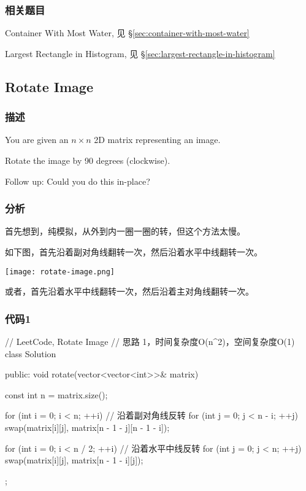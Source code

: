\subsubsection{相关题目}
\begindot
\item Container With Most Water, 见 \S \ref{sec:container-with-most-water}
\item Largest Rectangle in Histogram, 见 \S \ref{sec:largest-rectangle-in-histogram}
\myenddot


\subsection{Rotate Image} %
\label{sec:rotate-image}


\subsubsection{描述}
You are given an $n \times n$ 2D matrix representing an image.

Rotate the image by 90 degrees (clockwise).

Follow up:
Could you do this in-place?


\subsubsection{分析}
首先想到，纯模拟，从外到内一圈一圈的转，但这个方法太慢。

如下图，首先沿着副对角线翻转一次，然后沿着水平中线翻转一次。

\begin{center}
\texttt{[image: rotate-image.png]}\\
\label{fig:rotate-image}
\end{center}

或者，首先沿着水平中线翻转一次，然后沿着主对角线翻转一次。


\subsubsection{代码1}
\begin{Code}
// LeetCode, Rotate Image
// 思路 1，时间复杂度O(n^2)，空间复杂度O(1)
class Solution {
public:
    void rotate(vector<vector<int>>& matrix) {
        const int n = matrix.size();

        for (int i = 0; i < n; ++i)  // 沿着副对角线反转
            for (int j = 0; j < n - i; ++j)
                swap(matrix[i][j], matrix[n - 1 - j][n - 1 - i]);

        for (int i = 0; i < n / 2; ++i) // 沿着水平中线反转
            for (int j = 0; j < n; ++j)
                swap(matrix[i][j], matrix[n - 1 - i][j]);
    }
};
\end{Code}

